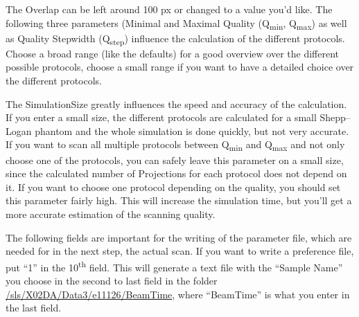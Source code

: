 \documentclass[a4paper]{scrartcl}
\begin{document}
The Overlap can be left around 100 px or changed to a value you'd like. The following three parameters (Minimal and Maximal Quality (Q\textsubscript{min}, Q\textsubscript{max}) as well as Quality Stepwidth (Q\textsubscript{step}) influence the calculation of the different protocols. Choose a broad range (like the defaults) for a good overview over the different possible protocols, choose a small range if you want to have a detailed choice over the different protocols.

The SimulationSize greatly influences the speed and accuracy of the calculation. If you enter a small size, the different protocols are calculated for a small Shepp--Logan phantom and the whole simulation is done quickly, but not very accurate. If you want to scan all multiple protocols between Q\textsubscript{min} and Q\textsubscript{max} and not only choose one of the protocols, you can safely leave this parameter on a small size, since the calculated number of Projections for each protocol does not depend on it. If you want to choose one protocol depending on the quality, you should set this parameter fairly high. This will increase the simulation time, but you'll get a more accurate estimation of the scanning quality.

The following fields are important for the writing of the parameter file, which are needed for in the next step, the actual scan. If you want to write a preference file, put ``1'' in the 10\textsuperscript{th} field. This will generate a text file with the ``Sample Name'' you choose in the second to last field in the folder \url{/sls/X02DA/Data3/e11126/BeamTime}, where ``BeamTime'' is what you enter in the last field.
\end{document}
